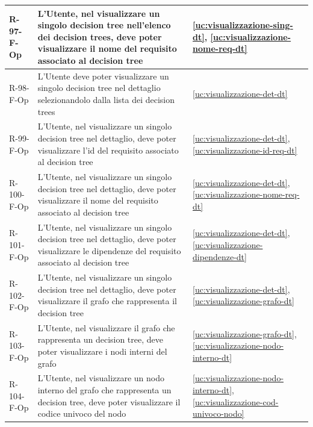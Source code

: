 ﻿\documentclass[a4paper,12pt]{article}
\begin{document}
{{\begin{longtable}{|l|p{}|p{}|}
            R-97-F-Op       & L'Utente, nel visualizzare un singolo decision tree nell'elenco dei decision trees, deve poter visualizzare il nome del requisito associato al decision tree                                & \ref{uc:visualizzazione-sing-dt}, \ref{uc:visualizzazione-nome-req-dt}             \\ \hline
            R-98-F-Op       & L'Utente deve poter visualizzare un singolo decision tree nel dettaglio selezionandolo dalla lista dei decision trees                                                                       & \ref{uc:visualizzazione-det-dt}                                               \\ \hline
            R-99-F-Op       & L'Utente, nel visualizzare un singolo decision tree nel dettaglio, deve poter visualizzare l'id del requisito associato al decision tree                                                    & \ref{uc:visualizzazione-det-dt}, \ref{uc:visualizzazione-id-req-dt}                 \\ \hline
            R-100-F-Op       & L'Utente, nel visualizzare un singolo decision tree nel dettaglio, deve poter visualizzare il nome del requisito associato al decision tree                                                 & \ref{uc:visualizzazione-det-dt}, \ref{uc:visualizzazione-nome-req-dt}                 \\ \hline
            R-101-F-Op       & L'Utente, nel visualizzare un singolo decision tree nel dettaglio, deve poter visualizzare le dipendenze del requisito associato al decision tree                                           & \ref{uc:visualizzazione-det-dt}, \ref{uc:visualizzazione-dipendenze-dt}                 \\ \hline
            R-102-F-Op       & L'Utente, nel visualizzare un singolo decision tree nel dettaglio, deve poter visualizzare il grafo che rappresenta il decision tree                                                        & \ref{uc:visualizzazione-det-dt}, \ref{uc:visualizzazione-grafo-dt}                 \\ \hline
            R-103-F-Op       & L'Utente, nel visualizzare il grafo che rappresenta un decision tree, deve poter visualizzare i nodi interni del grafo                                                                      & \ref{uc:visualizzazione-grafo-dt}, \ref{uc:visualizzazione-nodo-interno-dt}         \\ \hline
            R-104-F-Op       & L'Utente, nel visualizzare un nodo interno del grafo che rappresenta un decision tree, deve poter visualizzare il codice univoco del nodo                                                   & \ref{uc:visualizzazione-nodo-interno-dt}, \ref{uc:visualizzazione-cod-univoco-nodo} \\ \hline

\end{longtable}}}
\end{document}
